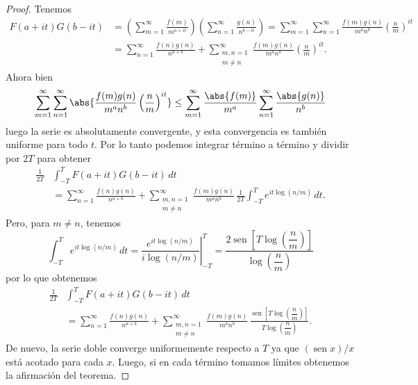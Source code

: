 \documentclass[12pt,a4paper]{book}
\begin{document}
    \begin{proof}
        Tenemos
        \begin{align*}
            F(a+it)G(b-it)&=\left(\sum_{m=1}^{\infty}\frac{f(m)}{m^{a+it}}\right)\left(\sum_{n=1}^{\infty}\frac{g(n)}{n^{b-it}}\right)
            =\sum_{m=1}^{\infty}\sum_{n=1}^{\infty}\frac{f(m)g(n)}{m^{a}n^{b}}\left(\frac{n}{m}\right)^{it}\\
            &=\sum_{n=1}^{\infty}\frac{f(n)g(n)}{n^{a+b}}+\sum_{\substack{m,n=1\\m\neq n}}^{\infty}\frac{f(m)g(n)}{m^{a}n^{b}}\left(\frac{n}{m}\right)^{it}.
        \end{align*}
        Ahora bien
        \begin{equation*}
            \sum_{m=1}^{\infty}\sum_{n=1}^{\infty}\abs{\frac{f(m)g(n)}{m^{a}n^{b}}\left(\frac{n}{m}\right)^{it}}\leq\sum_{m=1}^{\infty}\frac{\abs{f(m)}}{m^{a}}\sum_{n=1}^{\infty}\frac{\abs{g(n)}}{n^{b}}
        \end{equation*}
        luego la serie es absolutamente convergente, y esta convergencia es también uniforme
        para todo $t$. Por lo tanto podemos integrar término a término y dividir por $2T$
        para obtener
        \begin{align*}
            \frac{1}{2T}&\int_{-T}^{T}F(a+it)G(b-it)\,dt\\
            &=\sum_{n=1}^{\infty}\frac{f(n)g(n)}{n^{a+b}}+\sum_{\substack{m,n=1\\m\neq n}}^{\infty}\frac{f(m)g(n)}{m^{a}n^{b}}\,\frac{1}{2T}\int_{-T}^{T}e^{it\log(n/m)}\,dt.
        \end{align*}
        Pero, para $m\neq n$, tenemos
        \begin{equation*}
            \int_{-T}^{T}e^{it\log(n/m)}\,dt=\left.\frac{e^{it\log(n/m)}}{i\log(n/m)}\right|_{-T}^{T}=\frac{2\operatorname{sen}\left[T\log\left(\dfrac{n}{m}\right)\right]}{\log\left(\dfrac{n}{m}\right)}
        \end{equation*}
        por lo que obtenemos
        \begin{align*}
            \frac{1}{2T}&\int_{-T}^{T}F(a+it)G(b-it)\,dt\\
            &=\sum_{n=1}^{\infty}\frac{f(n)g(n)}{n^{a+b}}+\sum_{\substack{m,n=1\\m\neq n}}^{\infty}\frac{f(m)g(n)}{m^{a}n^{b}}\,\frac{\operatorname{sen}\left[T\log\left(\dfrac{n}{m}\right)\right]}{T\log\left(\dfrac{n}{m}\right)}.
        \end{align*}
        De nuevo, la serie doble converge uniformemente respecto a $T$ ya que
        $(\operatorname{sen}x)/x$ está acotado para cada $x$. Luego, si en cada término
        tomamos límites obtenemos la afirmación del teorema.
    \end{proof}
\end{document}

